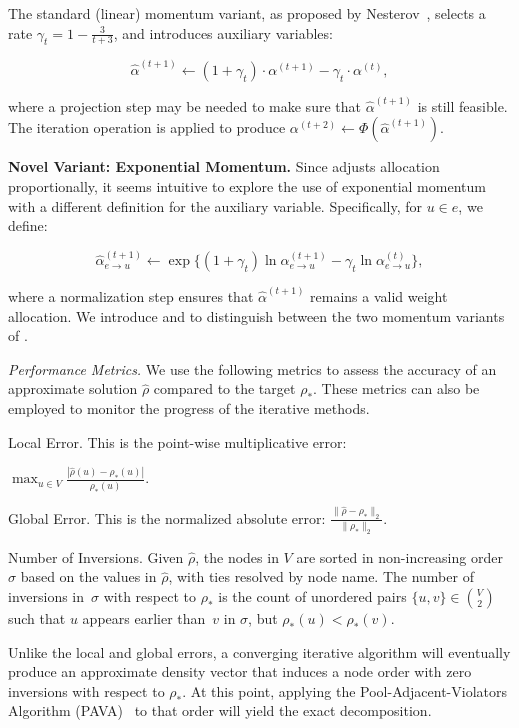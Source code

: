The standard (linear) momentum variant, as proposed by Nesterov~\cite{Nesterov1983AMF}, selects a rate $\gamma_t = 1 - \frac{3}{t+3}$,
and introduces auxiliary variables:



$$\widehat{\alpha}^{(t+1)} \gets
(1 + \gamma_t) \cdot \alpha^{(t+1)} - \gamma_t \cdot \alpha^{(t)},$$

where a projection step may be needed to make sure that
$\widehat{\alpha}^{(t+1)}$ is still feasible.
The iteration operation
is applied to produce $\alpha^{(t+2)} \gets \Phi(\widehat{\alpha}^{(t+1)})$.


\noindent \textbf{Novel Variant: Exponential Momentum.}
Since \pr adjusts allocation proportionally, it seems intuitive to explore the use of exponential momentum with a different definition for the auxiliary variable. Specifically, for $u \in e$, we define:

$$\widehat{\alpha}^{(t+1)}_{e \to u} \gets \exp\{
(1 + \gamma_t)  \ln  \alpha^{(t+1)}_{e \to u} - \gamma_t  \ln \alpha^{(t)}_{e \to u}\},$$

where a normalization step ensures that $\widehat{\alpha}^{(t+1)}$ remains a valid weight allocation. We introduce \prlin and \prexp to distinguish between the two momentum variants of \pr.


\noindent \emph{Performance Metrics.}
We use the following metrics to assess the accuracy of an approximate solution $\widehat{\rho}$ compared to the target $\rho_*$. These metrics can also be employed to monitor the progress of the iterative methods.


\begin{compactitem}

\item Local Error.
This is the point-wise multiplicative error: 

$\max_{u \in V} \frac{|\widehat{\rho}(u) - \rho_*(u)| }{\rho_*(u)}$.


\item Global Error.
This is the normalized absolute error:
$\frac{\|\widehat{\rho} - \rho_*\|_2 }{\|\rho_*\|_2}$.

\item Number of Inversions.
Given $\widehat{\rho}$, the nodes in $V$ are sorted in non-increasing order~$\sigma$ based on the values in $\widehat{\rho}$, with ties resolved by node name. The number of inversions in~$\sigma$ with respect to $\rho_*$ is the count of unordered pairs $\{u, v\} \in \binom{V}{2}$ such that $u$ appears earlier than~$v$ in $\sigma$, but $\rho_*(u) < \rho_*(v)$.

Unlike the local and global errors, a converging iterative algorithm will eventually produce an approximate density vector that induces a node order with zero inversions with respect to $\rho_*$. At this point, applying the Pool-Adjacent-Violators Algorithm (PAVA)~\cite{barlow1972statistical} to that order will yield the exact decomposition.


\end{compactitem}

